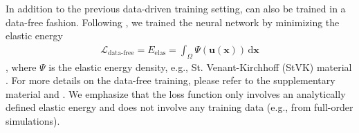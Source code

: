 In addition to the previous data-driven training setting,  can also be trained in a data-free fashion. Following \citet{Modi:2024:Simplicits}, we trained the neural network by minimizing the elastic energy 
\begin{align} \label{eq:training-data-free}
    \mathcal{L}_{\text{data-free}} = E_{\text{elas}} = \int_{\Omega}\Psi(\bm{u}(\bm{x})) \, \mathrm{d}\bm{x} 
\end{align}, where $\Psi$ is the elastic energy density, e.g., St. Venant-Kirchhoff (StVK) material \cite{barbivc2005real}. For more details on the data-free training, please refer to the supplementary material and \citep{Modi:2024:Simplicits}. We emphasize that the loss function only involves an analytically defined elastic energy and does not involve any training data (e.g., from full-order simulations).




















